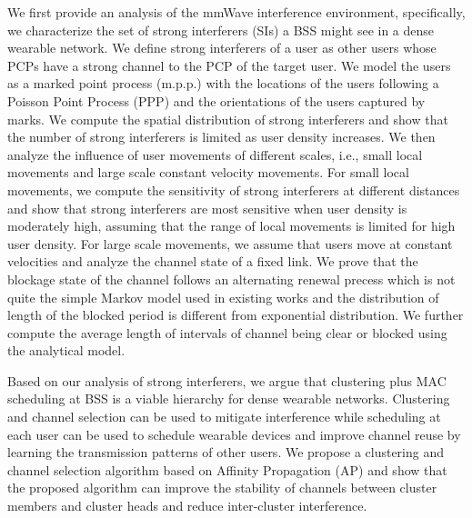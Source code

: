 \documentclass[10pt, conference, letterpaper]{IEEEtran}
\begin{document}
We first provide an analysis of the mmWave interference environment, specifically, we characterize the set of strong interferers (SIs) a BSS might see in a dense wearable network. We define strong interferers of a user as other users whose PCPs have a strong channel to the PCP of the target user. We model the users as a marked point process (m.p.p.) with the locations of the users following a Poisson Point Process (PPP) and the orientations of the users captured by marks. We compute the spatial distribution of strong interferers and show that the number of strong interferers is limited as user density increases. 
We then analyze the influence of user movements of different scales, i.e., small local movements and large scale constant velocity movements. For small local movements, we compute the sensitivity of strong interferers at different distances and show that strong interferers are most sensitive when user density is moderately high, assuming that the range of local movements is limited for high user density. For large scale movements, we assume that users move at constant velocities and analyze the channel state of a fixed link. We prove that the blockage state of the channel follows an alternating renewal precess which is not quite the simple Markov model used in existing works and the distribution of length of the blocked period is different from exponential distribution. We further compute the average length of intervals of channel being clear or blocked using the analytical model.

Based on our analysis of strong interferers, we argue that clustering plus MAC scheduling at BSS is a viable hierarchy for dense wearable networks. Clustering and channel selection can be used to mitigate interference while scheduling at each user can be used to schedule wearable devices and improve channel reuse by learning the transmission patterns of other users. We propose a clustering and channel selection algorithm based on Affinity Propagation (AP) and show that the proposed algorithm can improve the stability of channels between cluster members and cluster heads and reduce inter-cluster interference. 
\end{document}
